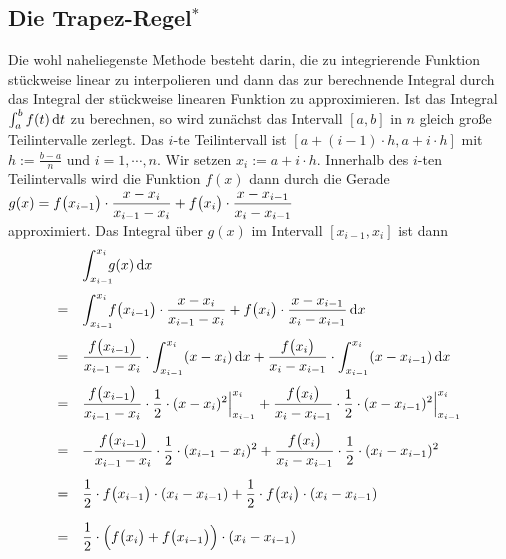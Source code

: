 \subsection{Die Trapez-Regel$^*$}
Die wohl naheliegenste Methode besteht darin, die zu integrierende Funktion st\"uckweise
linear zu interpolieren und dann das zur berechnende Integral durch das Integral der
st\"uckweise linearen Funktion zu approximieren.
Ist das Integral $\int_a^b f(t)\,\textrm{d} t$ zu berechnen, so wird zun\"achst das Intervall $[a,b]$
in $n$ gleich gro{\ss}e Teilintervalle zerlegt.  Das $i$-te Teilintervall ist $[a+(i-1)\cdot h,
a+i\cdot h]$ mit $h := \frac{b-a}{n}$ und $i=1,\cdots,n$.
Wir setzen $x_i := a+i\cdot h$.
Innerhalb des $i$-ten Teilintervalls wird die Funktion $f(x)$ dann durch die Gerade 
\\[0.2cm]
\hspace*{1.3cm}
$\displaystyle g(x) = f\bigl(x_{i-1}\bigr)\cdot \frac{x - x_i}{x_{i-1} - x_i} + f\bigl(x_{i}\bigr)\cdot \frac{x - x_{i-1}}{x_{i} - x_{i-1}}$
\\[0.2cm]
approximiert.  Das Integral \"uber $g(x)$ im Intervall $[x_{i-1}, x_i]$ ist dann
$$
\begin{array}[t]{cl}
  &  \dint{x_{i-1}}{x_i} g(x)\, \dr x \\[0.5cm]
= &  \dint{x_{i-1}}{x_i} f\bigl(x_{i-1}\bigr)\cdot \frac{x - x_i}{x_{i-1} - x_i} + f\bigl(x_{i}\bigr)\cdot \frac{x - x_{i-1}}{x_{i} - x_{i-1}}\,\dr x \\[0.5cm]
= &  \ds\frac{f\bigl(x_{i-1}\bigr)}{x_{i-1} - x_i} \cdot  \int_{x_{i-1}}^{x_i} (x - x_i)\,\dr x +
                  \frac{f\bigl(x_{i}\bigr)}{x_{i} - x_{i-1}} \cdot  \int_{x_{i-1}}^{x_i} (x - x_{i-1})\,\dr x \\[0.5cm]
= &  \ds\frac{f\bigl(x_{i-1}\bigr)}{x_{i-1} - x_i} \cdot \frac{1}{2} \cdot (x - x_i)^2 \Big|_{x_{i-1}}^{x_i}  +
                  \frac{f\bigl(x_{i}\bigr)}{x_{i} - x_{i-1}} \cdot \frac{1}{2} \cdot (x - x_{i-1})^2 \Big|_{x_{i-1}}^{x_i} \\[0.5cm]
= &  \ds-\frac{f\bigl(x_{i-1}\bigr)}{x_{i-1} - x_i} \cdot \frac{1}{2} \cdot (x_{i-1} - x_i)^2   +
                   \frac{f\bigl(x_{i}\bigr)}{x_{i} - x_{i-1}} \cdot \frac{1}{2} \cdot (x_i - x_{i-1})^2  \\[0.5cm]
= &  \ds \frac{1}{2} \cdot f\bigl(x_{i-1}\bigr) \cdot (x_i - x_{i-1}) +
     \frac{1}{2} \cdot f\bigl(x_{i}\bigr)   \cdot (x_i - x_{i-1})    \\[0.5cm]
= &  \ds \frac{1}{2} \cdot  \Bigl(f\bigl(x_{i}\bigr) + f\bigl(x_{i-1}\bigr)\Bigr) \cdot  (x_{i} - x_{i-1}) 
\end{array}
$$
